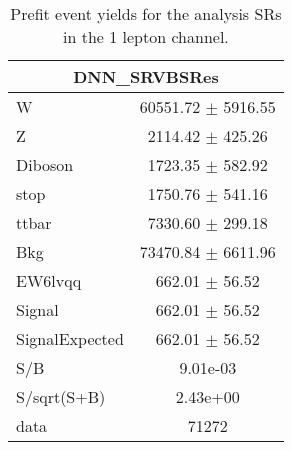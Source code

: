 \begin{table}
\begin{tabular}{|l|c|}
\hline
 \multicolumn{2}{|c|}{DNN\_SRVBSRes}\\ \hline
W & 60551.72 $\pm$ 5916.55\\
Z & 2114.42 $\pm$ 425.26\\
Diboson & 1723.35 $\pm$ 582.92\\
stop & 1750.76 $\pm$ 541.16\\
ttbar & 7330.60 $\pm$ 299.18\\
\hline
Bkg & 73470.84 $\pm$ 6611.96\\
\hline
EW6lvqq & 662.01 $\pm$ 56.52\\
\hline
Signal & 662.01 $\pm$ 56.52\\
SignalExpected & 662.01 $\pm$ 56.52\\
\hline
S/B & 9.01e-03\\
S/sqrt(S+B) & 2.43e+00\\
\hline
data & 71272\\ \hline
\end{tabular}
\caption{Prefit event yields for the analysis SRs in the 1 lepton channel.}
\label{tab:1lepPrefitYield_SR}
\end{table}


